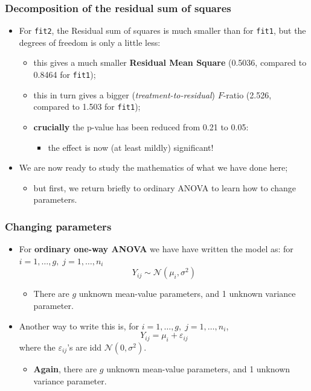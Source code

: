 \documentclass[a4paper]{article}\usepackage[]{graphicx}\usepackage[]{xcolor}
\begin{document}
\subsubsection{Decomposition of the residual sum of squares}
\begin{itemize}
	\item For \lstinline|fit2|, the Residual sum of squares is much smaller than for \lstinline|fit1|, but the degrees of freedom is only a little less:
	\begin{itemize}
		\item this gives a much smaller \textbf{Residual Mean Square} (0.5036, compared to 0.8464 for \lstinline|fit1|);
		\item this in turn gives a bigger (\textit{treatment-to-residual}) \( F \)-ratio (2.526, compared to 1.503 for \lstinline|fit1|);
		\item \textbf{crucially} the p-value has been reduced from 0.21 to 0.05:
		\begin{itemize}
			\item the effect is now (at least mildly) significant!
		\end{itemize}
	\end{itemize}
	\item We are now ready to study the mathematics of what we have done here;
	\begin{itemize}
		\item but first, we return briefly to ordinary ANOVA to learn how to change parameters.
	\end{itemize}
\end{itemize}
\subsubsection{Changing parameters}
\begin{itemize}
	\item For \textbf{ordinary one-way ANOVA} we have have written the model as: for \( i = 1,\dotsc,g,\;j = 1,\dotsc,n_i \) 
	\[
		Y_{ij} \sim \mathcal{N}(\mu_i,\sigma^2)
	\]
	\begin{itemize}
		\item There are \( g \) unknown mean-value parameters, and 1 unknown variance parameter.
	\end{itemize}
	\item Another way to write this is, for \( i = 1,\dotsc,g,\;j = 1,\dotsc,n_i \),
	\[
		Y_{ij} = \mu_i + \varepsilon_{ij}
	\]
	where the \( \varepsilon_{ij} \)'s are idd \( \mathcal{N}(0,\sigma^2) \).
	\begin{itemize}
		\item \textbf{Again}, there are \( g \) unknown mean-value parameters, and 1 unknown variance parameter.
	\end{itemize}
\end{itemize}
\end{document}
